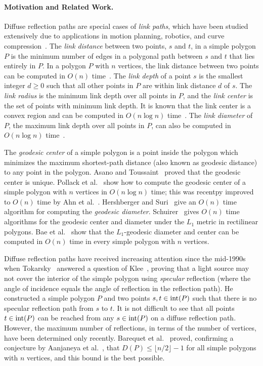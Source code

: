 \documentclass[12pt]{article}
\begin{document}
\paragraph{\bf Motivation and Related Work.}
Diffuse reflection paths are special cases of \emph{link paths}, which have been studied extensively due to applications in motion planning, robotics, and curve compression~\cite{G07,MSD00}.
The \emph{link distance} between two points, $s$ and $t$, in a simple polygon $P$ is the minimum number of edges in a polygonal path between $s$ and $t$ that lies entirely in $P$.
In a polygon $P$ with $n$ vertices, the link distance between two points can be computed in $O(n)$ time~\cite{S86}.
The \emph{link depth} of a point $s$ is the smallest integer $d\geq 0$ such that all other points in $P$ are within link distance $d$ of $s$.
The \emph{link radius} is the minimum link depth over all points in $P$, and the \emph{link center} is the set of points with minimum link depth.
It is known that the link center is a convex region and can be computed in $O(n\log n)$ time~\cite{DLS92}.
The \emph{link diameter} of $P$, the maximum link depth over all points in $P$, can also be computed in $O(n\log n)$ time~\cite{S90}.

The \emph{geodesic center} of a simple polygon is a point inside the polygon which minimizes the maximum shortest-path distance  (also known as geodesic distance) to any point in the polygon. Asano and Toussaint~\cite{AT85} proved that the geodesic center is unique. Pollack et al.~\cite{PSR89} show how to compute the geodesic center of a simple polygon with $n$ vertices in $O(n \log n)$ time; this was recentpy improved to $O(n)$ time by Ahn et al.~\cite{ABB+15}. Hershberger and Suri~\cite{HS97} give an $O(n)$ time algorithm for computing the \emph{geodesic diameter}. Schuirer~\cite{Sch94} gives $O(n)$ time algorithms for the geodesic center and diameter under the $L_1$ metric in rectilinear polygons. Bae et al.~\cite{BKOW14} show that the $L_1$-geodesic diameter and center can be computed in $O(n)$ time in every simple polygon with $n$ vertices.

Diffuse reflection paths have received increasing attention since the mid-1990s when Tokarsky~\cite{Tok95} answered a question of Klee~\cite{Kle69,Kle79}, proving that a light source may not cover the interior of the simple polygon using \emph{specular} reflection (where the angle of incidence equals the angle of reflection in the reflection path).
He constructed a simple polygon $P$ and two points $s,t\in {\rm int}(P)$ such that there is no specular reflection path from $s$ to $t$. It is not difficult to see that all points $t\in {\rm int}(P)$ can be reached from any $s\in {\rm int}(P)$ on a diffuse reflection path. However, the maximum number of reflections, in terms of the number of vertices, have been determined only recently. Barequet et al.~\cite{Us} proved, confirming a conjecture by Aanjaneya et al.~\cite{ABP08}, that $D(P)\leq \lfloor n/2\rfloor-1$ for all simple polygons with $n$ vertices, and this bound is the best possible.
\end{document}
